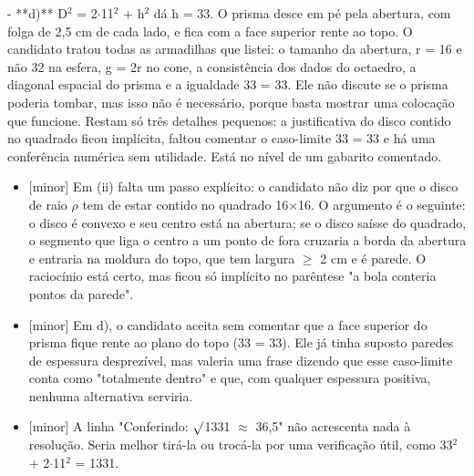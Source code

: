 \documentclass{article}%
\begin{document}
{-} **d)** D$^2$ = 2$\cdot$11$^2$ + h$^2$ dá h = 33. O prisma desce em pé pela abertura, com folga de 2,5 cm de cada lado, e fica com a face superior rente ao topo.\newline%
\newline%
O candidato tratou todas as armadilhas que listei: o tamanho da abertura, r = 16 e não 32 na esfera, g = 2r no cone, a consistência dos dados do octaedro, a diagonal espacial do prisma e a igualdade 33 = 33. Ele não discute se o prisma poderia tombar, mas isso não é necessário, porque basta mostrar uma colocação que funcione.\newline%
\newline%
Restam só três detalhes pequenos: a justificativa do disco contido no quadrado ficou implícita, faltou comentar o caso{-}limite 33 = 33 e há uma conferência numérica sem utilidade. Está no nível de um gabarito comentado.%
\begin{itemize}%
\item%
{[}minor{]} Em (ii) falta um passo explícito: o candidato não diz por que o disco de raio $\rho$ tem de estar contido no quadrado 16$\times$16. O argumento é o seguinte: o disco é convexo e seu centro está na abertura; se o disco saísse do quadrado, o segmento que liga o centro a um ponto de fora cruzaria a borda da abertura e entraria na moldura do topo, que tem largura $\geq$ 2 cm e é parede. O raciocínio está certo, mas ficou só implícito no parêntese "a bola conteria pontos da parede".%
\item%
{[}minor{]} Em d), o candidato aceita sem comentar que a face superior do prisma fique rente ao plano do topo (33 = 33). Ele já tinha suposto paredes de espessura desprezível, mas valeria uma frase dizendo que esse caso{-}limite conta como "totalmente dentro" e que, com qualquer espessura positiva, nenhuma alternativa serviria.%
\item%
{[}minor{]} A linha "Conferindo: $\surd$1331 $\approx$ 36,5" não acrescenta nada à resolução. Seria melhor tirá{-}la ou trocá{-}la por uma verificação útil, como 33$^2$ + 2$\cdot$11$^2$ = 1331.%
\end{itemize}%
\end{document}
